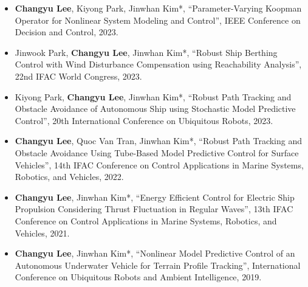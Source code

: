 \documentclass[10pt, letterpaper]{article}
\begin{document}
\begin{itemize}
            \vspace{0.2 cm}

        \item
        [\textbf{[C6]}]   \textbf{Changyu Lee}, Kiyong Park, Jinwhan Kim*, “Parameter-Varying Koopman Operator for Nonlinear System Modeling and Control”, \textcolor{NavyBlue}{IEEE Conference on Decision and Control}, 2023.
            
            \vspace{0.2 cm}
        
        \item [\textbf{[C5]}]   Jinwook Park, \textbf{Changyu Lee}, Jinwhan Kim*, “Robust Ship Berthing Control with Wind Disturbance Compensation using Reachability Analysis”, \textcolor{NavyBlue}{22nd IFAC World Congress}, 2023.
            
            \vspace{0.2 cm}
        
        \item [\textbf{[C4]}]   Kiyong Park, \textbf{Changyu Lee}, Jinwhan Kim*, “Robust Path Tracking and Obstacle Avoidance of Autonomous Ship using Stochastic Model Predictive Control”, \textcolor{NavyBlue}{20th International Conference on Ubiquitous Robots}, 2023.
            
            \vspace{0.2 cm}
        
        \item [\textbf{[C3]}]   \textbf{Changyu Lee}, Quoc Van Tran, Jinwhan Kim*, “Robust Path Tracking and Obstacle Avoidance Using Tube-Based Model Predictive Control for Surface Vehicles”, \textcolor{NavyBlue}{14th IFAC Conference on Control Applications in Marine Systems, Robotics, and Vehicles}, 2022.
            
            \vspace{0.2 cm}
        
        \item [\textbf{[C2]}]   \textbf{Changyu Lee}, Jinwhan Kim*, “Energy Efficient Control for Electric Ship Propulsion Considering Thrust Fluctuation in Regular Waves”, \textcolor{NavyBlue}{13th IFAC Conference on Control Applications in Marine Systems, Robotics, and Vehicles}, 2021.
            
            \vspace{0.2 cm}

        \item [\textbf{[C1]}]  \textbf{Changyu Lee}, Jinwhan Kim*, “Nonlinear Model Predictive Control of an Autonomous Underwater Vehicle for Terrain Profile Tracking”, \textcolor{NavyBlue}{International Conference on Ubiquitous Robots and Ambient Intelligence}, 2019.
    \end{itemize}
\end{document}
